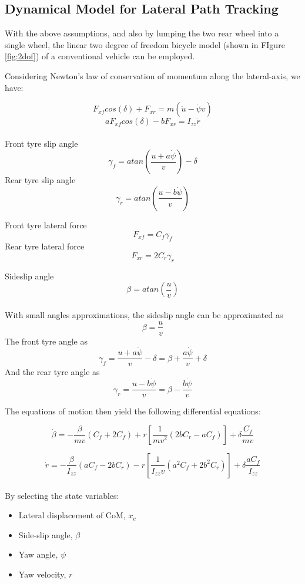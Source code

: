 \documentclass[a4paper, twocolumn]{article}
\begin{document}
\subsection{Dynamical Model for Lateral Path Tracking}
With the above assumptions, and also by lumping the two rear wheel into a single wheel, the linear two degree of freedom bicycle model (shown in FIgure \ref{fig:2dof}) of a 
conventional vehicle can be employed.

\noindent
Considering Newton's law of conservation of momentum along the lateral-axis, we have:

$$
F_{xf}cos(\delta) + F_{xr}= m(\dot{u} - \dot{\psi}v)
$$
$$
aF_{xf}cos(\delta) - bF_{xr}= I_{zz}\dot{r}
$$
\\
\noindent
Front tyre slip angle
$$
\gamma_{f}= atan\left(\frac{u+a\dot{\psi}}{v}\right)- \delta
$$
Rear tyre slip angle
$$
\gamma_{r}= atan\left(\frac{u-b\dot{\psi}}{v}\right)
$$

\noindent
Front tyre lateral force
$$
F_{xf}= C_{f}\gamma_{f}
$$
\noindent
Rear tyre lateral force
$$
F_{xr}= 2C_{r}\gamma_{r}
$$

\noindent
Sideslip angle
$$\beta= atan\left(\frac{u}{v}\right)$$
\\

\noindent
With small angles approximations, the sideslip angle can be approximated as 
$$\beta= \frac{u}{v}$$
\noindent
The front tyre angle as
$$\gamma_{f}= \frac{u+a\dot{\psi}}{v}- \delta= \beta + \frac{a\dot{\psi}}{v}+ \delta$$
\noindent
And the rear tyre angle as
$$\gamma_{r}= \frac{u-b\dot{\psi}}{v}= \beta- \frac{b\dot{\psi}}{v}$$


\noindent
The equations of motion then yield the following differential equations:

\footnotesize 
$$
\dot{\beta}= -\frac{\beta}{mv}\left( C_{f} + 2C_{f} \right) + r \left[\frac{1}{mv^{2}} \left(2bC_{r} 
    - aC_{f}\right)\right] + \delta \frac{C_{f}}{mv}  
$$

$$
\dot{r}= -\frac{\beta}{I_{zz}}\left(aC_{f} - 2bC_{r}\right) - r \left[\frac{1}{I_{zz}v} 
    \left(a^{2}C_{f} + 2b^{2}C_{r}\right) \right] + \delta \frac{aC_{f}}{I_{zz}} 
$$
\\

\normalsize
\noindent
By selecting the state variables:
\begin{itemize}[itemsep=2pt]
    \item Lateral displacement of CoM, $x_{c}$
    \item Side-slip angle, $\beta$
    \item Yaw angle, $\psi$
    \item Yaw velocity, $r$
\end{itemize}
\end{document}
